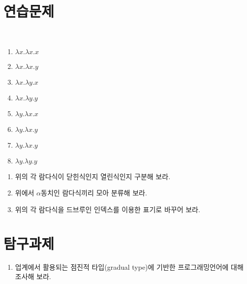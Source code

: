 \section*{연습문제}
~\vspace{-6ex}
\begin{multicols}{4}
  \begin{enumerate}[(1)]\tightlist
   \item $\lambda x.\lambda x.x$
   \item $\lambda x.\lambda x.y$
   \item $\lambda x.\lambda y.x$
   \item $\lambda x.\lambda y.y$
   \item $\lambda y.\lambda x.x$
   \item $\lambda y.\lambda x.y$
   \item $\lambda y.\lambda x.y$
   \item $\lambda y.\lambda y.y$
  \end{enumerate}
\end{multicols}
\begin{enumerate}
 \item 위의 각 람다식이 닫힌식인지 열린식인지 구분해 보라.
 \item 위에서 $\alpha$동치인 람다식끼리 모아 분류해 보라.
 \item 위의 각 람다식을 드브루인 인덱스를 이용한 표기로 바꾸어 보라.
\end{enumerate}

\section*{탐구과제}
\begin{enumerate}
 \item 업계에서 활용되는 점진적 타입(gradual type)에
       기반한 프로그래밍언어에 대해 조사해 보라.
\end{enumerate}

